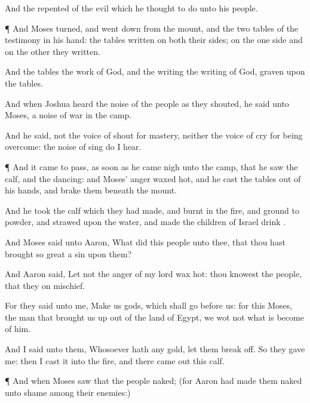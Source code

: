 {And the
{}
repented of the
evil which he
thought to
do unto his
people.


\par }{\PP {}¶ And
Moses
turned, and went
down from the
mount, and the
two
tables of the
testimony
{} in his
hand: the
tables
{}
written on
both their
sides; on the one side and on the other
{} they
written.

And the
tables
{} the
work of
God, and the
writing
{} the
writing of
God,
graven upon the
tables.

And when
Joshua
heard the
noise of the
people as they
shouted, he
said unto
Moses,
{} a
noise of
war in the
camp.

And he
said,
{} not the
voice of
{}
shout for
mastery, neither
{} the
voice of
{}
cry for being
overcome:
{} the
noise of
{}
sing do I
hear.


\par }{\PP {}¶ And it came to pass, as soon as he came
nigh unto the
camp, that he
saw the
calf, and the
dancing: and
Moses’
anger waxed
hot, and he
cast the
tables out of his
hands, and
brake them
beneath the
mount.

And he
took the
calf which they had
made, and
burnt
{} in the
fire, and
ground
{} to
powder, and
strawed
{}
upon the
water, and made the
children of
Israel
drink
{}.


\par }{\PP {}And
Moses
said unto
Aaron, What
did this
people unto thee, that thou hast
brought so
great a
sin upon them?

And
Aaron
said, Let not the
anger of my
lord wax
hot: thou
knowest the
people, that they
{} on
mischief.

For they
said unto me,
Make us
gods, which shall
go
before us: for
{} this
Moses, the
man that brought us
up out of the
land of
Egypt, we
wot not what is become of him.

And I
said unto them, Whosoever hath any
gold, let them
break
{} off. So they
gave
{} me: then I
cast it into the
fire, and there came
out this
calf.


\par }{\PP {}¶ And when
Moses
saw that the
people
{}
naked; (for
Aaron had made them
naked unto
{}
shame among their
enemies:)

}
